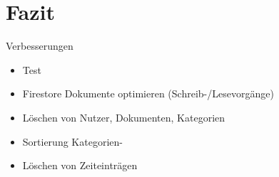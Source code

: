 \section{Fazit}\label{sec:fazit}
Verbesserungen
\begin{itemize}
    \item Test
    \item Firestore Dokumente optimieren (Schreib-/Lesevorgänge)
     \item Löschen von Nutzer, Dokumenten, Kategorien
    \item Sortierung Kategorien-
    \item Löschen von Zeiteinträgen 
\end{itemize}
